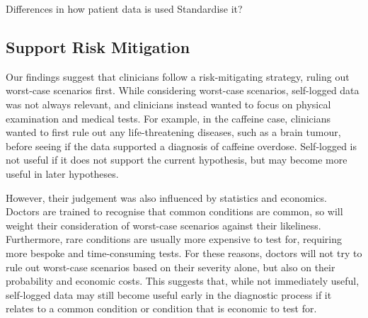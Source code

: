 \documentclass{sigchi}
\begin{document}




Differences in how patient data is used
Standardise it?

\label{sec:riskmit}\subsection{Support Risk Mitigation} %


Our findings suggest that clinicians follow a risk-mitigating strategy, ruling out worst-case scenarios first. While considering worst-case scenarios, self-logged data was not always relevant, and clinicians instead wanted to focus on physical examination and medical tests. For example, in the caffeine case, clinicians wanted to first rule out any life-threatening diseases, such as a brain tumour, before seeing if the data supported a diagnosis of caffeine overdose. Self-logged is not useful if it does not support the current hypothesis, but may become more useful in later hypotheses.

However, their judgement was also influenced by statistics and economics. Doctors are trained to recognise that common conditions are common, so will weight their consideration of worst-case scenarios against their likeliness. Furthermore, rare conditions are usually more expensive to test for, requiring more bespoke and time-consuming tests. For these reasons, doctors will not try to rule out worst-case scenarios based on their severity alone, but also on their probability and economic costs. This suggests that, while not immediately useful, self-logged data may still become useful early in the diagnostic process if it relates to a common condition or condition that is economic to test for.


\end{document}

